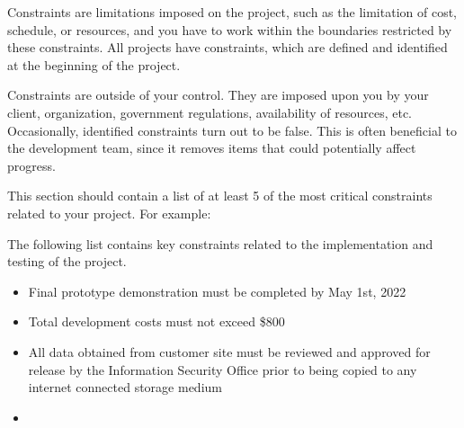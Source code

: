 Constraints are limitations imposed on the project, such as the limitation of cost, schedule, or resources, and you have to work within the boundaries restricted by these constraints. All projects have constraints, which are defined and identified at the beginning of the project.

Constraints are outside of your control. They are imposed upon you by your client, organization, government regulations, availability of resources, etc. Occasionally, identified constraints turn out to be false. This is often beneficial to the development team, since it removes items that could potentially affect progress.

This section should contain a list of at least 5 of the most critical constraints related to your project. For example:

The following list contains key constraints related to the implementation and testing of the project.

\begin{itemize}
  \item Final prototype demonstration must be completed by May 1st, 2022
  \item Total development costs must not exceed \$800
  \item All data obtained from customer site must be reviewed and approved for release by the Information Security Office prior to being copied to any internet connected storage medium
  \item 
\end{itemize}
